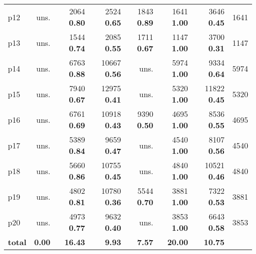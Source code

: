 \begin{tabular}{|l|rrrrrr|r|}
p12 & uns. & {\footnotesize 2064} \textbf{0.80} & {\footnotesize 2524} \textbf{0.65} & {\footnotesize 1843} \textbf{0.89} & {\footnotesize 1641} \textbf{1.00} & {\footnotesize 3646} \textbf{0.45} & 1641\\
p13 & uns. & {\footnotesize 1544} \textbf{0.74} & {\footnotesize 2085} \textbf{0.55} & {\footnotesize 1711} \textbf{0.67} & {\footnotesize 1147} \textbf{1.00} & {\footnotesize 3700} \textbf{0.31} & 1147\\
p14 & uns. & {\footnotesize 6763} \textbf{0.88} & {\footnotesize 10667} \textbf{0.56} & uns. & {\footnotesize 5974} \textbf{1.00} & {\footnotesize 9334} \textbf{0.64} & 5974\\
p15 & uns. & {\footnotesize 7940} \textbf{0.67} & {\footnotesize 12975} \textbf{0.41} & uns. & {\footnotesize 5320} \textbf{1.00} & {\footnotesize 11822} \textbf{0.45} & 5320\\
p16 & uns. & {\footnotesize 6761} \textbf{0.69} & {\footnotesize 10918} \textbf{0.43} & {\footnotesize 9390} \textbf{0.50} & {\footnotesize 4695} \textbf{1.00} & {\footnotesize 8536} \textbf{0.55} & 4695\\
p17 & uns. & {\footnotesize 5389} \textbf{0.84} & {\footnotesize 9659} \textbf{0.47} & uns. & {\footnotesize 4540} \textbf{1.00} & {\footnotesize 8107} \textbf{0.56} & 4540\\
p18 & uns. & {\footnotesize 5660} \textbf{0.86} & {\footnotesize 10755} \textbf{0.45} & uns. & {\footnotesize 4840} \textbf{1.00} & {\footnotesize 10521} \textbf{0.46} & 4840\\
p19 & uns. & {\footnotesize 4802} \textbf{0.81} & {\footnotesize 10780} \textbf{0.36} & {\footnotesize 5544} \textbf{0.70} & {\footnotesize 3881} \textbf{1.00} & {\footnotesize 7322} \textbf{0.53} & 3881\\
p20 & uns. & {\footnotesize 4973} \textbf{0.77} & {\footnotesize 9632} \textbf{0.40} & uns. & {\footnotesize 3853} \textbf{1.00} & {\footnotesize 6643} \textbf{0.58} & 3853\\
\hline
\textbf{total} & \textbf{0.00} & \textbf{16.43} & \textbf{9.93} & \textbf{7.57} & \textbf{20.00} & \textbf{10.75} & \\
\hline
\end{tabular}

